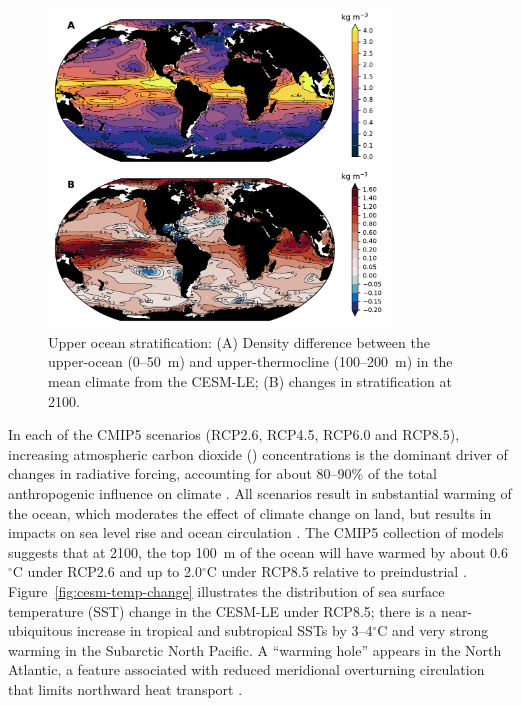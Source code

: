 \documentclass[draft,linenumbers]{report_chapter}
\begin{document}
\begin{figure}[tbp]
\centering
\includegraphics[width=0.8\textwidth]{cesm-stratification.pdf}
\caption{Upper ocean stratification: (A) Density difference between the upper-ocean (0--50~m) and upper-thermocline (100--200~m) in the mean climate from the CESM-LE; (B) changes in stratification at 2100.}
\label{fig:cesm-stratification}
\end{figure}

In each of the CMIP5 scenarios (RCP2.6, RCP4.5, RCP6.0 and RCP8.5), increasing atmospheric carbon dioxide () concentrations is the dominant driver of changes in radiative forcing, accounting for about 80--90\% of the total anthropogenic influence on climate \citep{Collins-Knutti-etal-2013}.
All scenarios result in substantial warming of the ocean, which moderates the effect of climate change on land, but results in impacts on sea level rise and ocean circulation \citep{Gattuso-Magnan-etal-2015}.
The CMIP5 collection of models suggests that at 2100, the top 100~m of the ocean will have warmed by about 0.6$^\circ$C under RCP2.6 and up to 2.0$^\circ$C under RCP8.5 relative to preindustrial \citep{Collins-Knutti-etal-2013}.
Figure~\ref{fig:cesm-temp-change} illustrates the distribution of sea surface temperature (SST) change in the CESM-LE under RCP8.5; there is a near-ubiquitous increase in tropical and subtropical SSTs by 3--4$^\circ$C and very strong warming in the Subarctic North Pacific.
A ``warming hole'' appears in the North Atlantic, a feature associated with reduced meridional overturning circulation that limits northward heat transport \citep{Drijfhout-Oldenborgh-etal-2012}.
\end{document}
